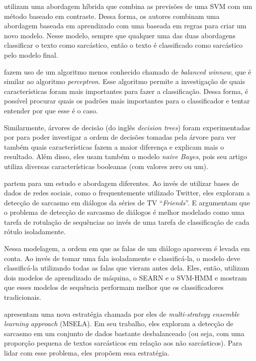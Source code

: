 \cite{riloff:2013:sarcasm-constract} utilizam uma abordagem híbrida que combina
as previsões de uma SVM com um método baseado em contraste. Dessa forma, os
autores combinam uma abordagem baseada em aprendizado com uma baseada em regras
para criar um novo modelo. Nesse modelo, sempre que qualquer uma das duas
abordagens classificar o texto como sarcástico, então o texto é classificado
como sarcástico pelo modelo final.

\cite{liebrecht:2013:perfect-solution} fazem uso de um algoritmo menos conhecido
chamado de \textit{balanced winnow}, que é similar ao algoritmo
\textit{perceptron}. Esse algoritmo permite a investigação de quais
características foram mais importantes para fazer a classificação.  Dessa forma,
é possível procurar quais os padrões mais importantes para o classificador e
tentar entender por que esse é o caso.

Similarmente, árvores de decisão (do inglês \textit{decision trees}) foram
experimentadas por \cite{reyes:2013:multidimensional-approach} para poder
investigar a ordem de decisões tomadas pela árvore para ver também quais
características fazem a maior diferença e explicam mais o resultado. Além disso,
eles usam também o modelo \textit{naive Bayes}, pois seu artigo utiliza diversas
características booleanas (com valores zero ou um).

\cite{joshi-etal:2016:harnessing} partem para um estudo e abordagem diferentes.
Ao invés de utilizar bases de dados de redes sociais, como o frequentemente
utilizado Twitter, eles exploram a detecção de sarcasmo em diálogos da séries de
TV ``\textit{Friends}''. E argumentam que o problema de detecção de sarcasmo de
diálogos é melhor modelado como uma tarefa de rotulação de sequências ao invés
de uma tarefa de classificação de cada rótulo isoladamente.

Nessa modelagem, a ordem em que as falas de um diálogo aparecem é levada em
conta. Ao invés de tomar uma fala isoladamente e classificá-la, o modelo deve
classificá-la utilizando todas as falas que vieram antes dela. Eles, então,
utilizam dois modelos de aprendizado de máquina, o SEARN e o SVM-HMM e mostram
que esses modelos de sequência performam melhor que os classificadores
tradicionais.

\cite{liu-etal:2014:imbalanced-classification} apresentam uma nova estratégia
chamada por eles de \textit{multi-strategy ensemble learning approach} (MSELA).
Em seu trabalho, eles exploram a detecção de sarcasmo em um conjunto de dados
bastante desbalanceado (ou seja, com uma proporção pequena de textos sarcásticos
em relação aos não sarcásticos). Para lidar com esse problema, eles propõem essa
estratégia.

